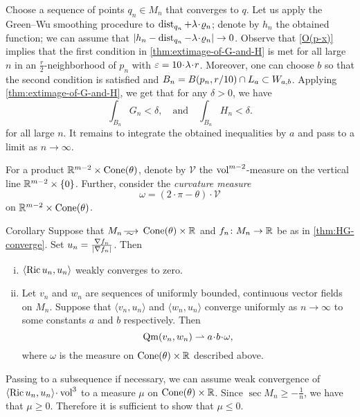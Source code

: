 Choose a sequence of points $q_n\in M_n$ that converges to $q$.
Let us apply the Green--Wu smoothing procedure to $\dist_{q_n}+\lambda\cdot \rho_n$;
denote by $h_n$ the obtained function; we can assume that $|h_n-\dist_{q_n}-\lambda\cdot \rho_n|\to 0$.
Observe that \ref{O(p-x)} implies that the first condition in \ref{thm:extimage-of-G-and-H} is met for all large $n$ in an $\tfrac r2$-neighborhood of $p_n$ with $\eps=10\cdot\lambda\cdot r$.
Moreover, one can choose $b$ so that the second condition is satisfied and $B_n=B(p_n,r/10)\cap L_a\zz\subset W_{a,b}$.
Applying \ref{thm:extimage-of-G-and-H}, we get that for any $\delta>0$, we have 
\[
\int_{B_n}G_n<\delta,
\quad\text{and}\quad
\int_{B_n}H_n<\delta.
\]
for all large $n$.
It remains to integrate the obtained inequalities by $a$ and pass to a limit as $n\to\infty$.
\qeds

For a product $\mathbb{R}^{m-2}\times \operatorname{Cone}(\theta)$, denote by $\mathcal{V}$ the $\operatorname{vol}^{m-2}$-measure on the vertical line $\RR^{m-2}\zz\times \{0\}$.
Further, consider the \emph{curvature measure} 
\[\omega=(2\cdot\pi-\theta)\cdot \mathcal{V}\]
on $\mathbb{R}^{m-2}\times \operatorname{Cone}(\theta)$. 


\begin{thm}{Corollary}\label{cor:Ricci}
Suppose that $M_n\smooths{}  \Cone(\theta)\times \RR$ and $f_n\colon M_n\to \mathbb{R}$ be as in \ref{thm:HG-converge}.
Set $u_n\zz=\tfrac{\nabla f_n}{|\nabla f_n|}$.
Then 

\begin{enumerate}[(i)]
\item\label{cor:Ricci:Ricci} $\langle \operatorname{\rm Ric} u_n,u_n\rangle$ weakly converges to zero.
\item\label{cor:Ricci:vw}
Let $v_n$ and $w_n$ are sequences of uniformly bounded, continuous vector fields on $M_n$.
Suppose that $\langle v_n,u_n\rangle$ and $\langle w_n,u_n\rangle$ converge uniformly as $n\to \infty$ to some constants $a$ and $b$ respectively.
Then 
\[\Qm(v_n,w_n)\rightharpoonup a\cdot b\cdot \omega,\]
where $\omega$ is the measure on $\operatorname{Cone}(\theta)\times \mathbb{R}$  described above.

\end{enumerate}

\end{thm}

Passing to a subsequence if necessary, we can assume weak convergence of $\langle \Ric u_n,u_n\rangle\zz\cdot\vol^3$ to a measure $\mu$ on $\operatorname{Cone}(\theta)\times \mathbb{R}$.
Since $\sec M_n\ge -\tfrac1n$, we have that $\mu\ge 0$.
Therefore it is sufficient to show that $\mu\le 0$.

